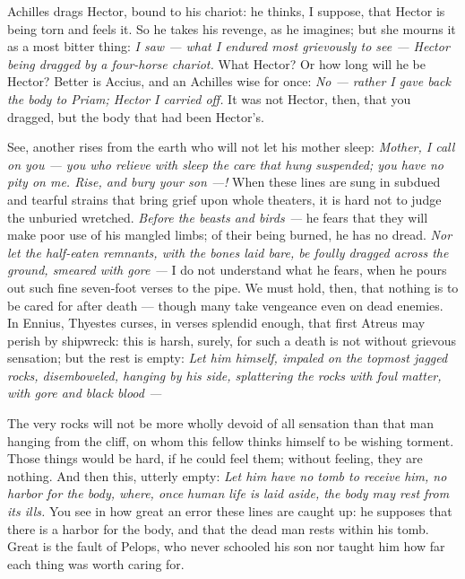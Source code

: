  Achilles drags Hector, bound to his chariot: he thinks, I suppose, that Hector is being torn and feels it. So he takes his revenge, as he imagines; but she mourns it as a most bitter thing: \textit{I saw — what I endured most grievously to see — Hector being dragged by a four-horse chariot.} What Hector? Or how long will he be Hector? Better is Accius, and an Achilles wise for once: \textit{No — rather I gave back the body to Priam; Hector I carried off.} It was not Hector, then, that you dragged, but the body that had been Hector's.

 See, another rises from the earth who will not let his mother sleep: \textit{Mother, I call on you — you who relieve with sleep the care that hung suspended; you have no pity on me. Rise, and bury your son —!} When these lines are sung in subdued and tearful strains that bring grief upon whole theaters, it is hard not to judge the unburied wretched. \textit{Before the beasts and birds —} he fears that they will make poor use of his mangled limbs; of their being burned, he has no dread. \textit{Nor let the half-eaten remnants, with the bones laid bare, be foully dragged across the ground, smeared with gore —} I do not understand what he fears, when he pours out such fine seven-foot verses to the pipe. We must hold, then, that nothing is to be cared for after death — though many take vengeance even on dead enemies. In Ennius, Thyestes curses, in verses splendid enough, that first Atreus may perish by shipwreck: this is harsh, surely, for such a death is not without grievous sensation; but the rest is empty: \textit{Let him himself, impaled on the topmost jagged rocks, disemboweled, hanging by his side, splattering the rocks with foul matter, with gore and black blood —}

 The very rocks will not be more wholly devoid of all sensation than that man hanging from the cliff, on whom this fellow thinks himself to be wishing torment. Those things would be hard, if he could feel them; without feeling, they are nothing. And then this, utterly empty: \textit{Let him have no tomb to receive him, no harbor for the body, where, once human life is laid aside, the body may rest from its ills.} You see in how great an error these lines are caught up: he supposes that there is a harbor for the body, and that the dead man rests within his tomb. Great is the fault of Pelops, who never schooled his son nor taught him how far each thing was worth caring for.

